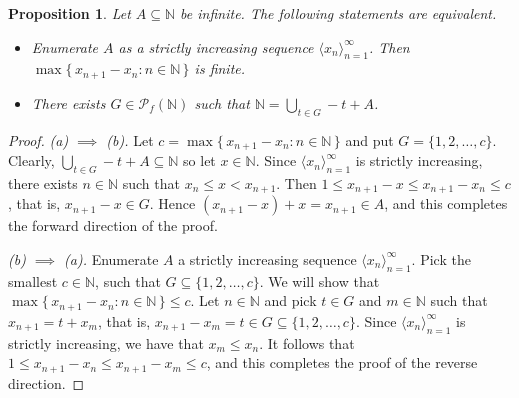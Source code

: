 \documentclass[12pt]{article}
\theoremstyle{plain}
\newtheorem{prop}[thm]{Proposition}
\theoremstyle{definition}
\newcommand{\la}{\langle}
\newcommand{\ra}{\rangle}
\newcommand{\bbN}{\mathbb{N}}
\newcommand{\Pf}{\mathcal{P}_f}
\begin{document}
\begin{prop}
  Let $A \subseteq \bbN$ be infinite.
  The following statements are equivalent.
  \begin{itemize}
    \item[(a)] Enumerate $A$ as a strictly increasing sequence $\la
      x_n \ra_{n=1}^\infty$.
      Then $\max\{\, x_{n+1} - x_n : n \in \bbN \,\}$ is finite.

    \item[(b)] There exists $G \in \Pf(\bbN)$ such that $\bbN =
      \bigcup_{t \in G} -t + A$. 
  \end{itemize}
\end{prop}
\begin{proof}
  \textsl{(a) $\implies$ (b).}
  Let $c = \max\{\, x_{n+1} - x_n : n \in \bbN \,\}$ and put $G = \{1,
  2, \ldots, c\}$. 
  Clearly, $\bigcup_{t \in G} -t + A \subseteq \bbN$ so let $x \in \bbN$. 
  Since $\la x_n \ra_{n=1}^\infty$ is strictly increasing, there
  exists $n \in \bbN$ such that $x_n \le x < x_{n+1}$.  
  Then $1 \le x_{n+1} - x \le x_{n+1} - x_n \le c$, that is, $x_{n+1}
  - x \in G$.
  Hence $(x_{n+1} - x) + x = x_{n+1} \in A$, and this completes the
  forward direction of the proof.

  \textsl{(b) $\implies$ (a).}
  Enumerate $A$ a strictly increasing sequence $\la x_n
  \ra_{n=1}^\infty$. 
  Pick the smallest $c \in \bbN$, such that $G \subseteq \{1, 2,
  \ldots, c\}$.
  We will show that $\max\{\, x_{n+1} - x_n : n \in \bbN \,\} \le c$. 
  Let $n \in \bbN$ and pick $t \in G$ and $m \in \bbN$ such that
  $x_{n+1} = t + x_m$, that is, $x_{n+1} - x_m = t \in G \subseteq
  \{1, 2, \ldots, c\}$. 
  Since $\la x_n \ra_{n=1}^\infty$ is strictly increasing, we have
  that $x_m \le x_n$.
  It follows that $1 \le x_{n+1} - x_n \le x_{n+1} - x_m \le c$, and
  this completes the proof of the reverse direction.
\end{proof}
\end{document}
